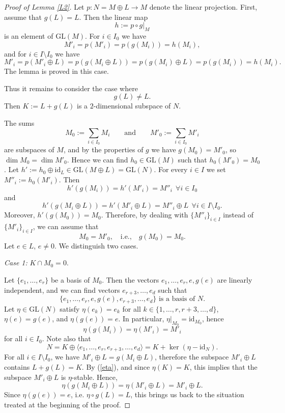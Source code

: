 \documentclass[12pt]{amsart}
\newcommand{\GL}{\mathrm{GL}}
\renewcommand{\span}[1]{\langle #1\rangle}
\numberwithin{equation}{section}
\theoremstyle{definition}
\begin{document}
\begin{proof}[Proof of Lemma \ref{L2}]
Let $p:N=M\oplus L\to M$ denote the linear projection.
First, assume that $g(L)=L$. Then the linear map
\[
h:=p\circ g|_M
\]
is an element of $\GL(M)$. For $i\in I_0$ we have
\[M'_i=p(M'_i)=p(g(M_i))=h(M_i),\]
and for $i\in I\setminus I_0$ we have
\[M'_i=p(M'_i\oplus L)=p(g(M_i\oplus L))=p(g(M_i)\oplus L)=p(g(M_i))=h(M_i).\]
The lemma is proved in this case. 

Thus it remains to consider the case where
\[g(L)\not=L.\]
Then $K:=L+g(L)$ is a $2$-dimensional subspace of $N$.

The sums 
\[M_0:=\sum_{i\in I_0}M_i \qquad\mbox{and}\qquad M'_0:=\sum_{i\in I_0}M'_i\]
are subspaces of $M$, and by the properties of $g$ we have $g(M_0)=M'_0$, so $\dim M_0=\dim M'_0$.
Hence we can find $h_0\in\GL(M)$ such that $h_0(M'_0)=M_0$. Let $h':=h_0\oplus\mathrm{id}_L\in\GL(M\oplus L)=\GL(N)$. For every $i\in I$ we set $M''_i:=h_0(M'_i)$. Then
\[
h'(g(M_i))=h'(M'_i)=M''_i\ \ \forall i\in I_0
\]
and
\[
h'(g(M_i\oplus L))=h'(M'_i\oplus L)=M''_i\oplus L\ \ \forall i\in I\setminus I_0.
\]
Moreover, $h'(g(M_0))=M_0$. Therefore, by dealing with $\{M''_i\}_{i\in I}$ instead of $\{M'_i\}_{i\in I}$, we can assume that 
\[M_0=M'_0,\quad \mbox{i.e.,}\quad g(M_0)=M_0.\]
Let $e\in L$, $e\not=0$.
We distinguish two cases.

\medskip
\noindent
{\it Case 1:} $K\cap M_0=0$.

Let $\{e_1,\ldots,e_r\}$ be a basis of $M_0$. Then the vectors $e_1,\ldots,e_r,e,g(e)$ are linearly independent, and we can find vectors $e_{r+3},\ldots,e_d$ such that
\[\{e_1,\ldots,e_r,e,g(e),e_{r+3},\ldots,e_d\}\mbox{ is a basis of $N$.}\]
Let $\eta\in\GL(N)$
satisfy $\eta(e_k)=e_k$ for all $k\in\{1,\ldots,r,r+3,\ldots,d\}$, $\eta(e)=g(e)$, and $\eta(g(e))=e$. In particular, $\eta|_{M_0}=\mathrm{id}_{M_0}$, hence \[\eta(g(M_i))=\eta(M'_i)=M'_i\]
for all $i\in I_0$.
Note also that
\begin{equation}
\label{eta}
N=K\oplus \span{e_1,\ldots,e_r,e_{r+3},\ldots,e_d}=K+\ker(\eta-\mathrm{id}_{N}).
\end{equation} 
For all $i\in I\setminus I_0$, we have $M'_i\oplus L=g(M_i\oplus L)$, therefore the subspace $M'_i\oplus L$ contains $L+g(L)=K$. By (\ref{eta}), and since $\eta(K)=K$, this implies that the subspace $M'_i\oplus L$ is $\eta$-stable. Hence,
\[\eta(g(M_i\oplus L))=\eta(M'_i\oplus L)=M'_i\oplus L.\]
Since $\eta(g(e))=e$, i.e. $\eta\circ g(L)=L$, this brings us back to the situation treated at the beginning of the proof.




\end{proof}
\end{document}
